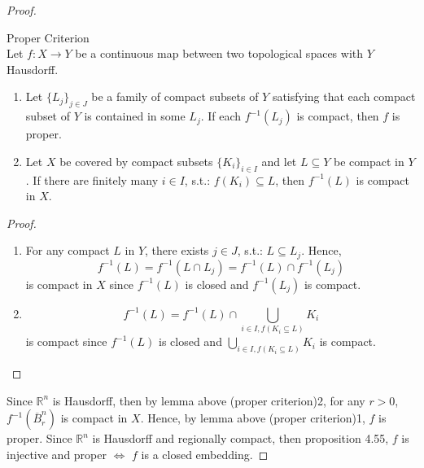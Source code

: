 \begin{proof}
    \begin{lemma}{Proper Criterion}\\
    Let $f:X \to Y$ be a continuous map between two topological spaces with $Y$ Hausdorff.
    \begin{enumerate}
        \item Let $\{ L_j\}_{j \in J}$ be a family of compact subsets of $Y$ satisfying that each compact subset of $Y$ is contained in some $L_j$. If each $f^{-1} (L_j)$ is compact, then $f$ is proper.

        \item Let $X$ be covered by compact subsets $\{K_i\}_{i \in I}$ and let $L \subseteq Y$ be compact in $Y$. If there are finitely many $i \in I$, s.t.: $f(K_i) \subseteq L$, then $f^{-1} (L)$ is compact in $X$.
    \end{enumerate}
    \end{lemma}

    \begin{proof}
        \begin{enumerate}
            \item For any compact $L$ in $Y$, there exists $j \in J$, s.t.: $L \subseteq L_j$. Hence,
            $$f^{-1} (L) = f^{-1} (L \cap L_j) = f^{-1}(L) \cap f^{-1} (L_j)$$
            is compact in $X$ since $f^{-1}(L)$ is closed and $f^{-1} (L_j)$ is compact.
            \item $$f^{-1} (L) = f^{-1} (L) \cap \bigcup_{i\in I,f(K_i \subseteq L)} K_{i}$$
            is compact since $f^{-1} (L)$ is closed and $\bigcup_{i\in I,f(K_i \subseteq L)} K_{i}$ is compact.
        \end{enumerate}
    \end{proof}
    Since $\mathbb{R}^n$ is Hausdorff, then by lemma above (proper criterion)2, for any $r>0$, $f^{-1} (\overline{B}_r^n)$ is compact in $X$. Hence, by lemma above (proper criterion)1, $f$ is proper. Since $\mathbb{R}^n$ is Hausdorff and regionally compact, then proposition 4.55, $f$ is injective and proper $\Leftrightarrow$ $f$ is a closed embedding.
\end{proof}

